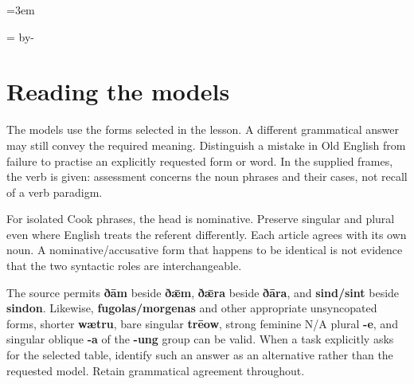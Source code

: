 \newcommand{\runningtitle}{Unit 1. Answer key}

\emergencystretch=3em
\newcommand{\reserve}[1]{\par\penalty-100\begingroup\dimen0=\pagegoal\advance\dimen0 by-\pagetotal\ifdim\dimen0<#1\newpage\fi\endgroup}
\newcommand{\itempara}[2]{\par\addvspace{3pt}\begingroup\raggedright\noindent\hangindent=1.8em\hangafter=1\makebox[1.8em][l]{#1.}#2\par\endgroup}

\raggedright
{}

\reserve{4\baselineskip}
\section*{Reading the models}

The models use the forms selected in the lesson. A different grammatical answer may still convey the required meaning. Distinguish a mistake in Old English from failure to practise an explicitly requested form or word. In the supplied frames, the verb is given: assessment concerns the noun phrases and their cases, not recall of a verb paradigm.

For isolated Cook phrases, the head is nominative. Preserve singular and plural even where English treats the referent differently. Each article agrees with its own noun. A nominative/\allowbreak{}accusative form that happens to be identical is not evidence that the two syntactic roles are interchangeable.

The source permits \textbf{ðām} beside \textbf{ðǣm}, \textbf{ðǣra} beside \textbf{ðāra}, and \textbf{sind/\allowbreak{}sint} beside \textbf{sindon}. Likewise, \textbf{fugolas/\allowbreak{}morgenas} and other appropriate unsyncopated forms, shorter \textbf{wætru}, bare singular \textbf{trēow}, strong feminine N/\allowbreak{}A plural \textbf{-e}, and singular oblique \textbf{-a} of the \textbf{-ung} group can be valid. When a task explicitly asks for the selected table, identify such an answer as an alternative rather than the requested model. Retain grammatical agreement throughout.

